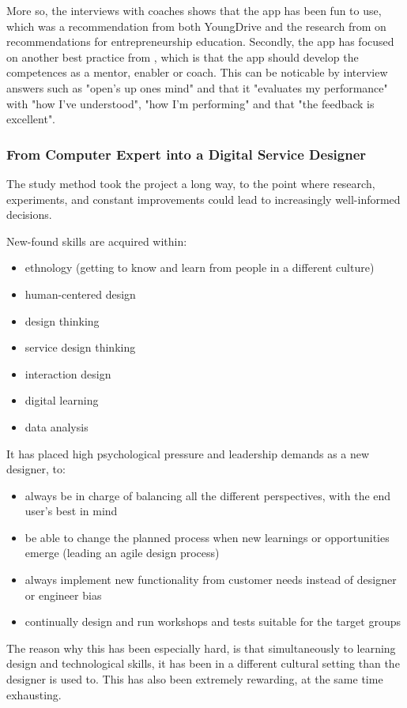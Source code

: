   More so, the interviews with coaches shows that the app has been fun to use, which was a recommendation from both YoungDrive and the research from \cite{dickson} on recommendations for entrepreneurship education. Secondly, the app has focused on another best practice from \cite{dickson}, which is that the app should develop the competences as a mentor, enabler or coach. This can be noticable by interview answers such as "open's up ones mind" and that it "evaluates my performance" with "how I've understood", "how I'm performing" and that "the feedback is excellent".

  \subsubsection{From Computer Expert into a Digital Service Designer}
  The study method took the project a long way, to the point where research, experiments, and constant improvements could lead to increasingly well-informed decisions.

  New-found skills are acquired within:
  \begin{itemize}
  \item ethnology (getting to know and learn from people in a different culture)
  \item human-centered design
  \item design thinking
  \item service design thinking
  \item interaction design
  \item digital learning
  \item data analysis
  \end{itemize}

  It has placed high psychological pressure and leadership demands as a new designer, to:
  \begin{itemize}
  \item always be in charge of balancing all the different perspectives, with the end user's best in mind
  \item be able to change the planned process when new learnings or opportunities emerge (leading an agile design process)
  \item always implement new functionality from customer needs instead of designer or engineer bias
  \item continually design and run workshops and tests suitable for the target groups
  \end{itemize}

  The reason why this has been especially hard, is that simultaneously to learning design and technological skills, it has been in a different cultural setting than the designer is used to. This has also been extremely rewarding, at the same time exhausting.

